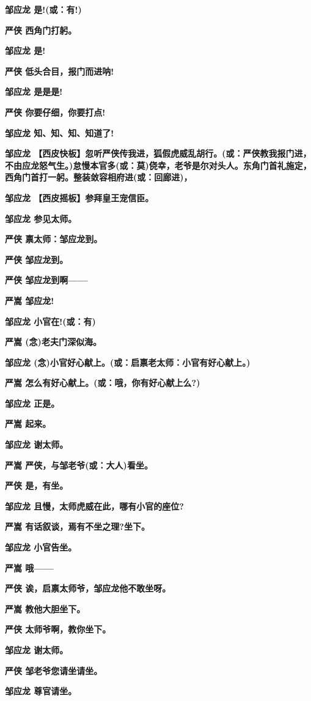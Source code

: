 \textbf{邹应龙 是!(或：有!)}

\textbf{严侠 西角门打躬。}

\textbf{邹应龙 是!}

\textbf{严侠 低头合目，报门而进呐!}

\textbf{邹应龙 是是是!}

\textbf{严侠 你要仔细，你要打点!}

\textbf{邹应龙 知、知、知、知道了!}

\textbf{邹应龙
【西皮快板】忽听严侠传我进，狐假虎威乱胡行。(或：严侠教我报门进，不由应龙怒气生。)怠慢本官多(或：莫)侥幸，老爷是尔对头人。东角门首礼施定，西角门首打一躬。整装敛容相府进(或：回廊进)，}

\textbf{邹应龙 【西皮摇板】参拜皇王宠信臣。}

\textbf{邹应龙 参见太师。}

\textbf{严侠 禀太师：邹应龙到。}

\textbf{严侠 邹应龙到。}

\textbf{严侠 邹应龙到啊------}

\textbf{严嵩 邹应龙!}

\textbf{邹应龙 小官在!(或：有)}

\textbf{严嵩 (念)老夫门深似海。}

\textbf{邹应龙 (念)小官好心献上。(或：启禀老太师：小官有好心献上。)}

\textbf{严嵩 怎么有好心献上。(或：哦，你有好心献上么?)}

\textbf{邹应龙 正是。}

\textbf{严嵩 起来。}

\textbf{邹应龙 谢太师。}

\textbf{严嵩 严侠，与邹老爷(或：大人)看坐。}

\textbf{严侠 是，有坐。}

\textbf{邹应龙 且慢，太师虎威在此，哪有小官的座位?}

\textbf{严嵩 有话叙谈，焉有不坐之理?坐下。}

\textbf{邹应龙 小官告坐。}

\textbf{严嵩 哦------}

\textbf{严侠 诶，启禀太师爷，邹应龙他不敢坐呀。}

\textbf{严嵩 教他大胆坐下。}

\textbf{严侠 太师爷啊，教你坐下。}

\textbf{邹应龙 谢太师。}

\textbf{严侠 邹老爷您请坐请坐。}

\textbf{邹应龙 尊官请坐。}

